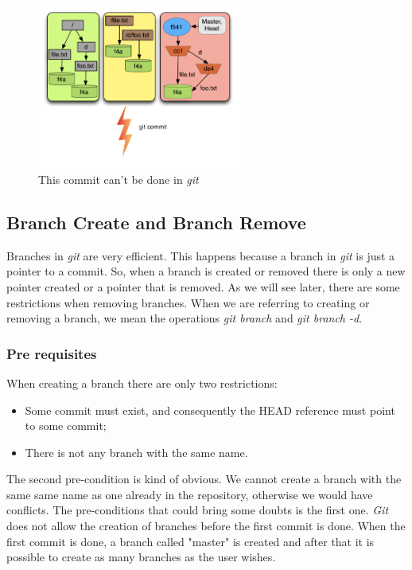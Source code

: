 \begin{figure}[!t]
   \centering
   \includegraphics[width=0.6\textwidth]{images/commit_pre.png}
   \caption{This commit can't be done in \emph{git}}\label{fig:commit_pre}
\end{figure}

\subsection{Branch Create and Branch Remove}
Branches in \emph{git} are very efficient. This happens because a
branch in \emph{git} is just a pointer to a commit. So, when a branch
is created or removed there is only a new pointer created or a
pointer that is removed. As we will see later, there are some
restrictions when removing branches. When we are referring to
creating or removing a branch, we mean the operations
\emph{git branch} and \emph{git branch -d}.

\subsubsection{Pre requisites}
When creating a branch there are only two restrictions:
\begin{itemize}
   \item Some commit must exist, and consequently the HEAD reference must point
   to some commit;
   \item There is not any branch with the same name.
\end{itemize}
The second pre-condition is kind of obvious. We cannot create a branch
with the same same name as one already in the repository, otherwise we
would have conflicts. The pre-conditions that could bring some doubts
is the first one. \emph{Git} does not allow the creation of branches
before the first commit is done. When the first commit is done, a
branch called "master" is created and after that it is possible to
create as many branches as the user wishes.\\

